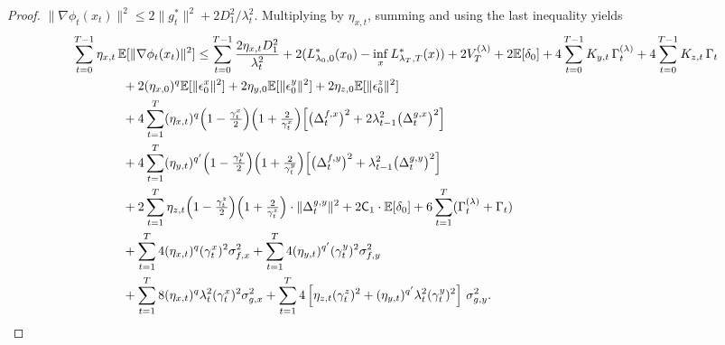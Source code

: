 \documentclass{uai2026} %
\newcommand{\EE}{\mathbb{E}}
\begin{document}
\begin{proof}
$\|\nabla\phi_t(x_t)\|^2\le 2\|g_t^{*}\|^2 + 2D_1^2/\lambda_t^2$.
Multiplying by $\eta_{x,t}$, summing and using the last inequality yields
\begin{align}
     \MoveEqLeft[4]\sum_{t=0}^{T-1} \eta_{x,t}\,\EE[\|\nabla\phi_{t}(x_{t})\|^2]
\le \sum_{t=0}^{T-1}\frac{2\eta_{x,t}D_{1}^{2}}{\lambda_{t}^{2}}+2(L^{*}_{\lambda_0,0}(x_0) - \inf_x L^{*}_{\lambda_T,T}(x)) + 2V_T^{(\lambda)}+ 2\EE[\delta_0]
+ 4\sum_{t=0}^{T-1} K_{y,t}\,\Gamma_t^{(\lambda)} + 4\sum_{t=0}^{T-1} K_{z,t}\,\Gamma_t \notag\\
&+2(\eta_{x,0})^{q}\mathbb{E}[\|\epsilon_{0}^{x}\|^{2}]+2\eta_{y,0}\mathbb{E}[\|\epsilon_{0}^y\|^2]+2\eta_{z,0}\mathbb{E}[\|\epsilon_{0}^z\|^2]\nonumber\\
 &
+ 4\sum_{t=1}^{T}(\eta_{x,t})^{q}\Big(1-\tfrac{\gamma_t^x}{2}\Big)\Big(1+\tfrac{2}{\gamma_t^x}\Big)\!\left[
\big(\Delta_t^{f,x}\big)^2+2\lambda_{t-1}^2\big(\Delta_t^{g,x}\big)^2\right]\notag\\
&+ 4\sum_{t=1}^{T}(\eta_{y,t})^{q'}\Big(1-\tfrac{\gamma_t^y}{2}\Big)\Big(1+\tfrac{2}{\gamma_t^y}\Big)\!\left[
\big(\Delta_t^{f,y}\big)^2+\lambda_{t-1}^2\big(\Delta_t^{g,y}\big)^2\right]\notag\\
&+ 2\sum_{t=1}^{T}\eta_{z,t}\Big(1-\tfrac{\gamma_t^z}{2}\Big)\Big(1+\tfrac{2}{\gamma_t^z}\Big)\cdot\|\Delta_{t}^{g,y}\|^{2}+2\mathsf{C}_{1}\cdot \mathbb{E}[\delta_{0}]+6\sum_{t=1}^{T}(\Gamma_{t}^{(\lambda)}+\Gamma_{t})\nonumber\\
&+\sum_{t=1}^{T}4(\eta_{x,t})^{q}(\gamma_t^x)^2\sigma_{f,x}^2+\sum_{t=1}^{T}4(\eta_{y,t})^{q'}(\gamma_t^y)^2\sigma_{f,y}^2\nonumber\\
&+\sum_{t=1}^{T}8(\eta_{x,t})^{q}\lambda_t^2(\gamma_t^x)^2\sigma_{g,x}^2+ \sum_{t=1}^{T}4\left[\eta_{z,t}(\gamma_t^z)^2+(\eta_{y,t})^{q'}\lambda_t^2(\gamma_t^y)^2\right]\,\sigma_{g,y}^2.\label{eq_01010105}
\end{align}



\end{proof}
\end{document}
